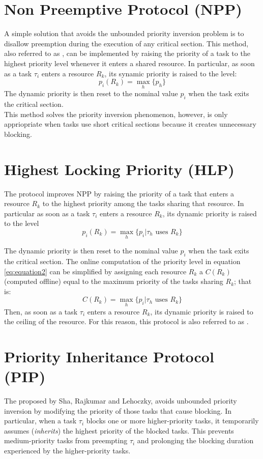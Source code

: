 \section{Non Preemptive Protocol (NPP)} 
A simple solution that avoids the unbounded priority inversion problem is to disallow preemption during the execution of any critical section. This method, also referred to as , can be implemented by raising the priority of a task to the highest priority level whenever it enters a shared resource. In particular, as soon as a task $\tau_i$ enters a resource $R_k$, its synamic priority is raised to the level:
\[p_i(R_k) = \max_h \{p_h\}\]
The dynamic priority is then reset to the nominal value $p_i$ when the task exits the critical section.\\
This method solves the priority inversion phenomenon, however, is only appriopriate when tasks use short critical sections because it creates unnecessary blocking.


\section{Highest Locking Priority (HLP)}
The  protocol improves NPP by raising the priority of a task that enters a resource $R_k$ to the highest priority among the tasks sharing that resource. In particular as soon as a task $\tau_i$ enters a resource $R_k$, its dynamic priority is raised to the level
\begin{equation}
\label{eq:equation2}
p_i(R_k) = \max_h\{p_i | \tau_h \text{ uses } R_k\}
\end{equation}

The dynamic priority is then reset to the nominal value $p_i$ when the task exits the critical section. The online computation of the priority level in equation \ref{eq:equation2} can be simplified by assigning each resource $R_k$ a  $C(R_k)$ (computed offline) equal to the maximum priority of the tasks sharing $R_k$; that is:
\[C(R_k) = \max_h\{p_i | \tau_h \text{ uses } R_k\}\]
Then, as soon as a task $\tau_i$ enters a resource $R_k$, its dynamic priority is raised to the ceiling of the resource. For this reason, this protocol is also referred to as .

\section{Priority Inheritance Protocol (PIP)}
The  proposed by Sha, Rajkumar and Lehoczky, avoids unbounded priority inversion by modifying the priority of those tasks that cause blocking. In particular, when a task $\tau_i$ blocks one or more higher-priority tasks, it temporarily assumes (\textit{inherits}) the highest priority of the blocked tasks. This prevents medium-priority tasks from preempting $\tau_i$ and prolonging the blocking duration experienced by the higher-priority tasks.


